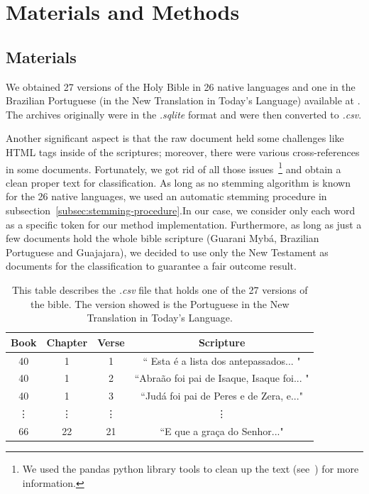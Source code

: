 \documentclass[runningheads]{llncs}
\begin{document}
    \section{Materials and Methods}\label{sec:materials-methods}
    \subsection{Materials}\label{materials}
    We obtained 27 versions of the Holy Bible in 26 native languages and one in the Brazilian Portuguese  (in the New Translation in Today's Language) available at \cite{angelo}.  The archives originally were in the \textit{.sqlite} format and were then converted to \textit{.csv}.

    Another significant aspect is that the raw document held some challenges like HTML tags inside of the scriptures; moreover, there were various cross-references in some documents. Fortunately, we got rid of all those issues~\footnote{
        We used the pandas python library tools to clean up the text (see~\cite{pandas-dev_2020}) for more information. } and obtain a clean proper text for classification. As long as no stemming algorithm is known for the 26 native languages, we used an automatic stemming procedure in subsection~\ref{subsec:stemming-procedure}.In our case, we consider only each word as a specific token for our method implementation. Furthermore, as long as just a few documents hold the whole bible scripture (Guarani Mybá, Brazilian Portuguese and Guajajara), we decided to use only the New Testament as documents for the classification to guarantee a fair outcome result.
    \begin{table}[ht!]
        \caption{This table describes the \textit{.csv}
            file that holds one of the 27 versions of the bible. The version showed is the Portuguese in the New Translation in Today's Language.}
        \begin{center}
            \begin{tabular}{|c|c|c|c|}
                \hline
                \textbf{Book} & \textbf{Chapter}& \textbf{Verse}& \textbf{Scripture} \\
                \hline
                40 & 1 & 1 & `` Esta é a lista dos antepassados... " \\
                \hline
                40 & 1 & 2 & ``Abraão foi pai de Isaque, Isaque foi... " \\
                \hline
                40 & 1 & 3 &   ``Judá foi pai de Peres e de Zera, e..."  \\
                \hline
                \vdots & \vdots & \vdots & \vdots\\
                \hline
                66 & 22 & 21 & ``E que a graça do Senhor..." \\
                \hline
            \end{tabular}
            \label{tab1}
        \end{center}
    \end{table}
\end{document}
